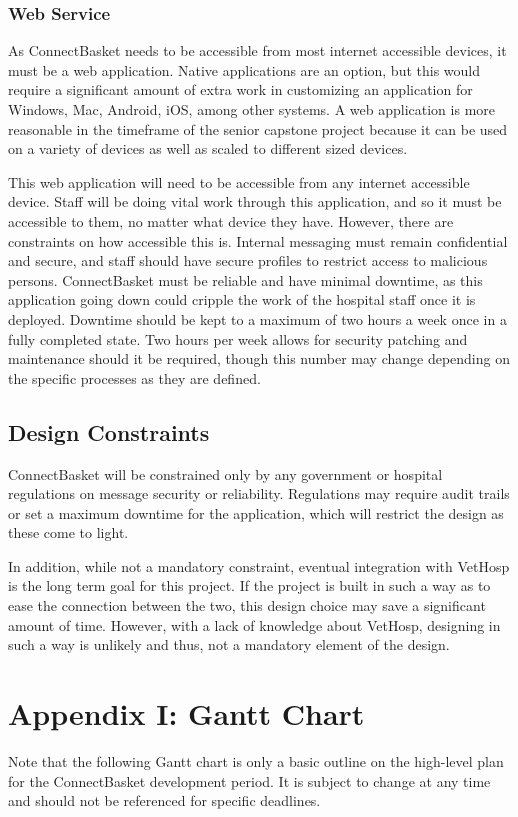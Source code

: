 \documentclass[onecolumn, draftclsnofoot,10pt, compsoc]{IEEEtran}
\begin{document}
\subsubsection{Web Service}
As ConnectBasket needs to be accessible from most internet accessible devices, it must be a web application. Native applications are an option, but this would require a significant amount of extra work in customizing an application for Windows, Mac, Android, iOS, among other systems. A web application is more reasonable in the timeframe of the senior capstone project because it can be used on a variety of devices as well as scaled to different sized devices.

This web application will need to be accessible from any internet accessible device. Staff will be doing vital work through this application, and so it must be accessible to them, no matter what device they have. However, there are constraints on how accessible this is. Internal messaging must remain confidential and secure, and staff should have secure profiles to restrict access to malicious persons. ConnectBasket must be reliable and have minimal downtime, as this application going down could cripple the work of the hospital staff once it is deployed. Downtime should be kept to a maximum of two hours a week once in a fully completed state. Two hours per week allows for security patching and maintenance should it be required, though this number may change depending on the specific processes as they are defined.

\subsection{Design Constraints}
ConnectBasket will be constrained only by any government or hospital regulations on message security or reliability. Regulations may require audit trails or set a maximum downtime for the application, which will restrict the design as these come to light.

In addition, while not a mandatory constraint, eventual integration with VetHosp is the long term goal for this project. If the project is built in such a way as to ease the connection between the two, this design choice may save a significant amount of time. However, with a lack of knowledge about VetHosp, designing in such a way is unlikely and thus, not a mandatory element of the design.
\newpage
\section{Appendix I: Gantt Chart}
Note that the following Gantt chart is only a basic outline on the high-level plan for the ConnectBasket development period. It is subject to change at any time and should not be referenced for specific deadlines.
\end{document}
